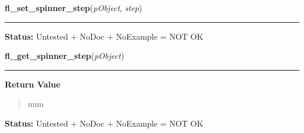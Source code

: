     \label{xformslib:library:fl_set_spinner_step}

    \vspace{0.5ex}

\hspace{.8\funcindent}\begin{boxedminipage}{\funcwidth}

    \raggedright \textbf{fl\_set\_spinner\_step}(\textit{pObject}, \textit{step})

    \vspace{-1.5ex}

    \rule{\textwidth}{0.5\fboxrule}
\setlength{\parskip}{2ex}
\setlength{\parskip}{1ex}
\textbf{Status:} Untested + NoDoc + NoExample = NOT OK



    \end{boxedminipage}

    \label{xformslib:library:fl_get_spinner_step}

    \vspace{0.5ex}

\hspace{.8\funcindent}\begin{boxedminipage}{\funcwidth}

    \raggedright \textbf{fl\_get\_spinner\_step}(\textit{pObject})

    \vspace{-1.5ex}

    \rule{\textwidth}{0.5\fboxrule}
\setlength{\parskip}{2ex}
\setlength{\parskip}{1ex}
      \textbf{Return Value}
    \vspace{-1ex}

      \begin{quote}
      num

      \end{quote}

\textbf{Status:} Untested + NoDoc + NoExample = NOT OK



    \end{boxedminipage}

    \label{xformslib:library:fl_set_spinner_precision}

